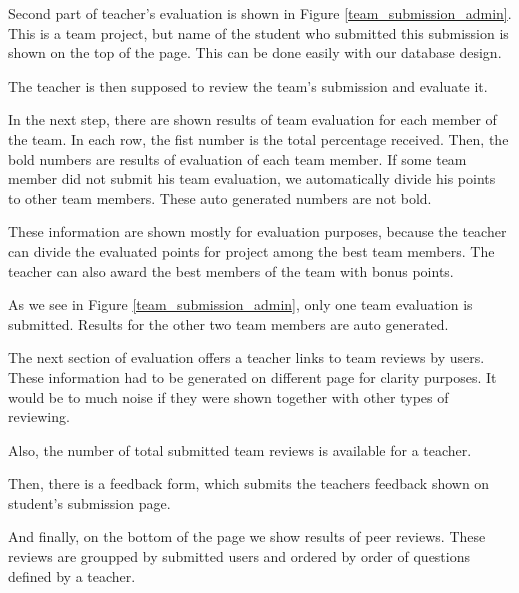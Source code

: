 Second part of teacher's evaluation is shown in Figure \ref{team_submission_admin}. This is a team project, but name of the student who submitted this submission is shown on the top of the page. This can be done easily with our database design. 

The teacher is then supposed to review the team's submission and evaluate it. 

In the next step, there are shown results of team evaluation for each member of the team. In each row, the fist number is the total percentage received. Then, the bold numbers are results of evaluation of each team member. If some team member did not submit his team evaluation, we automatically divide his points to other team members. These auto generated numbers are not bold.

These information are shown mostly for evaluation purposes, because the teacher can divide the evaluated points for project among the best team members. The teacher can also award the best members of the team with bonus points.

As we see in Figure \ref{team_submission_admin}, only one team evaluation is submitted. Results for the other two team members are auto generated.

The next section of evaluation offers a teacher links to team reviews by users. These information had to be generated on different page for clarity purposes. It would be to much noise if they were shown together with other types of reviewing.

Also, the number of total submitted team reviews is available for a teacher.

Then, there is a feedback form, which submits the teachers feedback shown on student's submission page.

And finally, on the bottom of the page we show results of peer reviews. These reviews are groupped by submitted users and ordered by order of questions defined by a teacher.
